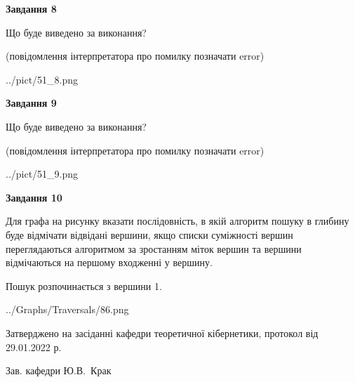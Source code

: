 \documentclass[12pt, ukrainian]{article}
\begin{document}
{\begin {large}
{\begin {center}\textbf{Завдання 8}\end {center}}\par
Що буде виведено за виконання?\par
 (повідомлення інтерпретатора про помилку позначати error)
\begin{center}
	{../pict/51_8.png}
\end{center}
\newpage

{\begin {center}\textbf{Завдання 9}\end {center}}\par
Що буде виведено за виконання?\par
 (повідомлення інтерпретатора про помилку позначати error)\par
\begin{center}
	{../pict/51_9.png}
\end{center}
\newpage

{\begin {center}\textbf{Завдання 10}\end {center}}\par
Для графа на рисунку вказати послідовність, в якій алгоритм пошуку в глибину буде відмічати відвідані вершини, якщо списки суміжності вершин переглядаються алгоритмом за зростанням міток вершин та вершини відмічаються на першому вход\-женні у вершину.\par
Пошук розпочинається з вершини 1.\par

\begin{center}
	{../Graphs/Traversals/86.png}
\end{center}\par
\newpage


\end {large}
}
{\smallskip \begin {small} Затверджено на засіданні кафедри теоретичної кібернетики, протокол  від   29.01.2022 р.\par\smallskip\smallskip
{\parbox {6.5 cm}{Зав. кафедри \dotfill Ю.В.~Крак}} \end{small}}
\end{document}
